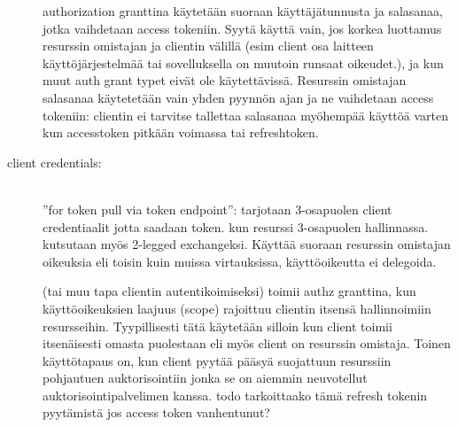 \documentclass[finnish,gradu]{tktltiki}
\begin{document}
\begin{description}
    authorization granttina käytetään suoraan käyttäjätunnusta ja salasanaa, jotka vaihdetaan access tokeniin. Syytä käyttä vain, jos korkea luottamus resurssin omistajan ja clientin välillä (esim client osa laitteen käyttöjärjestelmää tai sovelluksella on muutoin runsaat oikeudet.), ja kun muut auth grant typet eivät ole käytettävissä. Resurssin omistajan salasanaa käytetetään vain yhden pyynnön ajan ja ne vaihdetaan access tokeniin: clientin ei tarvitse tallettaa salasanaa myöhempää käyttöä varten kun accesstoken pitkään voimassa tai refreshtoken.

    \item[client credentials:] \hfill \\
    ''for token pull via token endpoint'': tarjotaan 3-osapuolen client credentiaalit  jotta saadaan token. kun resurssi 3-osapuolen hallinnassa. kutsutaan myös 2-legged exchangeksi. Käyttää suoraan resurssin omistajan oikeuksia eli toisin kuin muissa virtauksissa, käyttöoikeutta ei delegoida.

    (tai muu tapa clientin autentikoimiseksi) toimii authz granttina, kun käyttöoikeuksien laajuus (scope) rajoittuu clientin itsensä hallinnoimiin resursseihin. Tyypillisesti tätä käytetään silloin kun client toimii itsenäisesti omasta puolestaan eli myös client on resurssin omistaja. Toinen käyttötapaus on, kun client pyytää pääsyä suojattuun resurssiin pohjautuen auktorisointiin jonka se on aiemmin neuvotellut auktorisointipalvelimen kanssa. todo tarkoittaako tämä refresh tokenin pyytämistä jos access token vanhentunut?

   \end{description}




\end{document}
